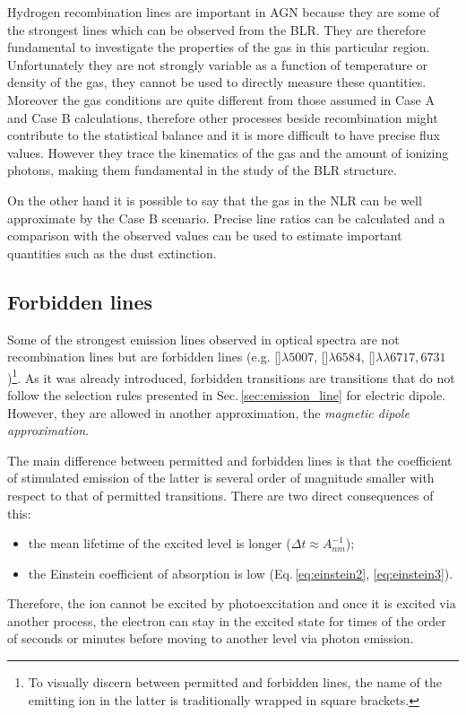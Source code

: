 \documentclass[../thesis.tex]{subfiles}
\begin{document}
Hydrogen recombination lines are important in AGN because they are some of the strongest lines which can be observed from the BLR.
They are therefore fundamental to investigate the properties of the gas in this particular region.
Unfortunately they are not strongly variable as a function of temperature or density of the gas, they cannot be used to directly measure these quantities.
Moreover the gas conditions are quite different from those assumed in Case A and Case B calculations, therefore other processes beside recombination might contribute to the statistical balance and it is more difficult to have precise flux values.
However they trace the kinematics of the gas and the amount of ionizing photons, making them fundamental in the study of the BLR structure.

On the other hand it is possible to say that the gas in the NLR can be well approximate by the Case B scenario.
Precise line ratios can be calculated and a comparison with the observed values can be used to estimate important quantities such as the dust extinction.
 
\subsection{Forbidden lines}
\label{sec:forb_line}

Some of the strongest emission lines observed in optical spectra are not recombination lines but are forbidden lines (e.g. []$\lambda5007$, []$\lambda6584$, []$\lambda\lambda6717,6731$)\footnote{To visually discern between permitted and forbidden lines, the name of the emitting ion in the latter is traditionally wrapped in square brackets.}.
As it was already introduced, forbidden transitions are transitions that do not follow the selection rules presented in Sec.\,\ref{sec:emission_line} for electric dipole.
However, they are allowed in another approximation, the \emph{magnetic dipole approximation}.

The main difference between permitted and forbidden lines is that the coefficient of stimulated emission of the latter is several order of magnitude smaller with respect to that of permitted transitions.
There are two direct consequences of this:
\begin{itemize}
    \item the mean lifetime of the excited level is longer ($\Delta t \approx A_{nm}^{-1}$);
    \item the Einstein coefficient of absorption is low (Eq.\,\ref{eq:einstein2}, \ref{eq:einstein3}).
\end{itemize}
Therefore, the ion cannot be excited by photoexcitation and once it is excited via another process, the electron can stay in the excited state for times of the order of seconds or minutes before moving to another level via photon emission.
\end{document}
